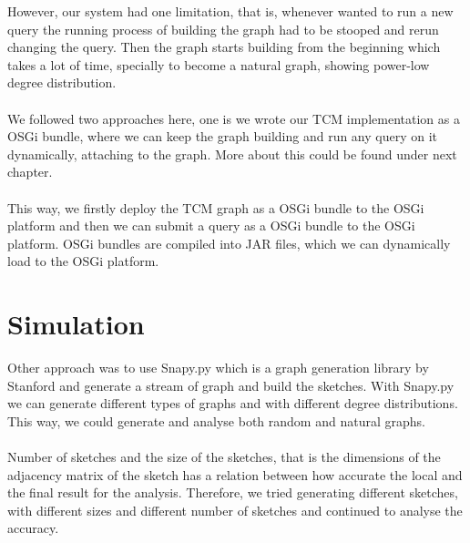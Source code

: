 \documentclass[12pt]{report}
\numberwithin{figure}{section}
\numberwithin{table}{section}
\begin{document}
However, our system had one limitation, that is, whenever wanted to run a new query the running process of building the graph had to be stooped and rerun changing the query. Then the graph starts building from the beginning which takes a lot of time, specially to become a  natural graph, showing power-low degree distribution. 

\paragraph{}

We followed two approaches here, one is we wrote our TCM implementation as a OSGi bundle, where we can keep the graph building and run any query on it dynamically, attaching to the graph. More about this could be found under next chapter. 

\paragraph{}

This way, we firstly deploy the TCM graph as a OSGi bundle to the OSGi platform and then we can submit a query as a OSGi bundle to the OSGi platform. OSGi bundles are compiled into JAR files, which we can dynamically load to the OSGi platform. 

\section{Simulation}

Other approach was to use Snapy.py which is a graph generation library by Stanford and generate a stream of graph and build the sketches.  With Snapy.py we can generate different types of graphs and with different degree distributions. This way, we could generate and analyse both random and natural graphs.


\paragraph{}

Number of sketches and the size of the sketches, that is the dimensions of the adjacency matrix of the sketch has a relation between how accurate the local and the final result for the analysis. Therefore, we tried generating different sketches, with different sizes and different number of sketches and continued to analyse the accuracy. 

\paragraph{}
\end{document}
